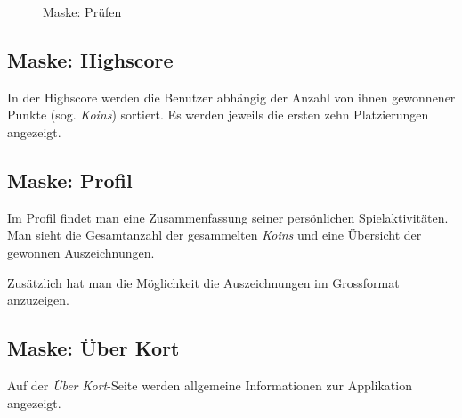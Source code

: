 \begin{figure}[H]
\hfill
{}
\caption{Maske: Prüfen}
\end{figure}

\subsection{Maske: Highscore}
In der Highscore werden die Benutzer abhängig der Anzahl von ihnen gewonnener Punkte (sog. \emph{Koins}) sortiert.
Es werden jeweils die ersten zehn Platzierungen angezeigt.

\subsection{Maske: Profil}
Im Profil findet man eine Zusammenfassung seiner persönlichen Spielaktivitäten.
Man sieht die Gesamtanzahl der gesammelten \emph{Koins} und eine Übersicht der gewonnen Auszeichnungen.

Zusätzlich hat man die Möglichkeit die Auszeichnungen im Grossformat anzuzeigen.

\subsection{Maske: Über Kort}
Auf der \emph{Über Kort}-Seite werden allgemeine Informationen zur Applikation angezeigt.

